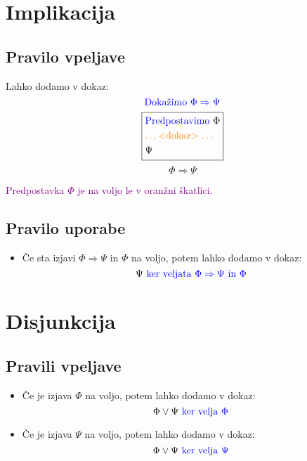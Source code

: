 \documentclass[12pt,a4paper]{article}
\newcommand{\blue}[1]{\textcolor{blue}{#1}}
\newcommand{\orange}[1]{\textcolor{orange}{#1}}
\newcommand{\purple}[1]{\textcolor{purple}{#1}}
\begin{document}
\section{Implikacija}
    \subsection*{Pravilo vpeljave}
    Lahko dodamo v dokaz:
    $$ \blue{\text{Dokažimo } \Phi \Rightarrow \Psi}  $$
    \begin{equation*}
        \boxed{
        \begin{aligned}
            &\blue{\text{Predpostavimo }} \Phi  \\ 
            &\orange{\text{\ldots <dokaz> \ldots}} \\ 
            &\Psi
        \end{aligned}
        }
    \end{equation*}
    $$ \Phi \Rightarrow \Psi $$

    \noindent \purple{Predpostavka $ \Phi $ je na voljo le v oranžni škatlici.}

    \subsection*{Pravilo uporabe}
    \begin{itemize}
        \item Če sta izjavi $ \Phi \Rightarrow \Psi $ in $ \Phi $ na voljo, potem lahko dodamo v dokaz:
        $$  \Psi \blue{\text{ ker veljata } \Phi \Rightarrow \Psi \text{ in } \Phi}   $$
    \end{itemize}

\section{Disjunkcija}
    \subsection*{Pravili vpeljave}
    \begin{itemize}
        \item Če je izjava $\Phi$ na voljo, potem lahko dodamo v dokaz:
        $$ \Phi \vee \Psi \blue{\text{ ker velja } \Phi } $$
        \item Če je izjava $\Psi$ na voljo, potem lahko dodamo v dokaz:
        $$ \Phi \vee \Psi \blue{\text{ ker velja } \Psi } $$
    \end{itemize}
\end{document}
